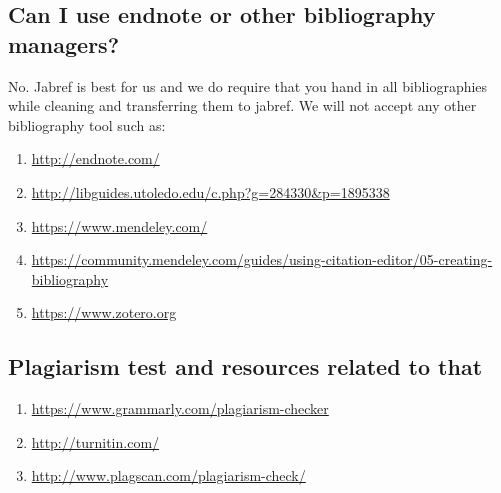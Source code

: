 \subsection{Can I use endnote or other bibliography managers?}
\label{\detokenize{faq:can-i-use-endnote-or-other-bibliography-managers}}
No. Jabref is best for us and we do require that you hand in all
bibliographies while cleaning and transferring them to jabref. We will
not accept any other bibliography tool such as:
\begin{enumerate}
\item {} 
\url{http://endnote.com/}

\item {} 
\url{http://libguides.utoledo.edu/c.php?g=284330\&p=1895338}

\item {} 
\url{https://www.mendeley.com/}

\item {} 
\url{https://community.mendeley.com/guides/using-citation-editor/05-creating-bibliography}

\item {} 
\url{https://www.zotero.org}

\end{enumerate}


\subsection{Plagiarism test and resources related to that}
\label{\detokenize{faq:plagiarism-test-and-resources-related-to-that}}\begin{enumerate}
\item {} 
\url{https://www.grammarly.com/plagiarism-checker}

\item {} 
\url{http://turnitin.com/}

\item {} 
\url{http://www.plagscan.com/plagiarism-check/}

\end{enumerate}


